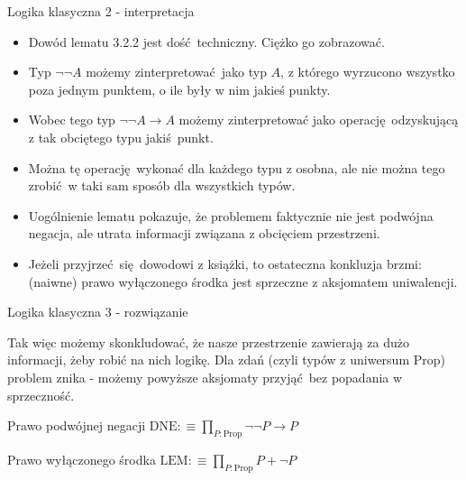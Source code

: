 \documentclass{beamer}
\newcommand{\defn}{:\equiv}
\newcommand{\Prop}{\text{Prop}}
\begin{document}
\begin{frame}{Logika klasyczna 2 - interpretacja}
\begin{itemize}
	\item Dowód lematu 3.2.2 jest dość techniczny. Ciężko go zobrazować.
	\item Typ $\neg\neg A$ możemy zinterpretować jako typ $A$, z którego wyrzucono wszystko poza jednym punktem, o ile były w nim jakieś punkty.
	\item Wobec tego typ $\neg\neg A \to A$ możemy zinterpretować jako operację odzyskującą z tak obciętego typu jakiś punkt.
	\item Można tę operację wykonać dla każdego typu z osobna, ale nie można tego zrobić w taki sam sposób dla wszystkich typów.
	\item Uogólnienie lematu pokazuje, że problemem faktycznie nie jest podwójna negacja, ale utrata informacji związana z obcięciem przestrzeni.
	\item Jeżeli przyjrzeć się dowodowi z książki, to ostateczna konkluzja brzmi: (naiwne) prawo wyłączonego środka jest sprzeczne z aksjomatem uniwalencji.
\end{itemize}
\end{frame}

\begin{frame}{Logika klasyczna 3 - rozwiązanie}

Tak więc możemy skonkludować, że nasze przestrzenie zawierają za dużo informacji, żeby robić na nich logikę. Dla zdań (czyli typów z uniwersum $\Prop$) problem znika - możemy powyższe aksjomaty przyjąć bez popadania w sprzeczność.

\begin{block}{Prawo podwójnej negacji}
$\text{DNE} \defn \prod_{P : \Prop} \neg\neg P \to P$
\end{block}

\begin{block}{Prawo wyłączonego środka}
$\text{LEM} \defn \prod_{P : \Prop} P + \neg P$
\end{block}

\end{frame}
\end{document}

